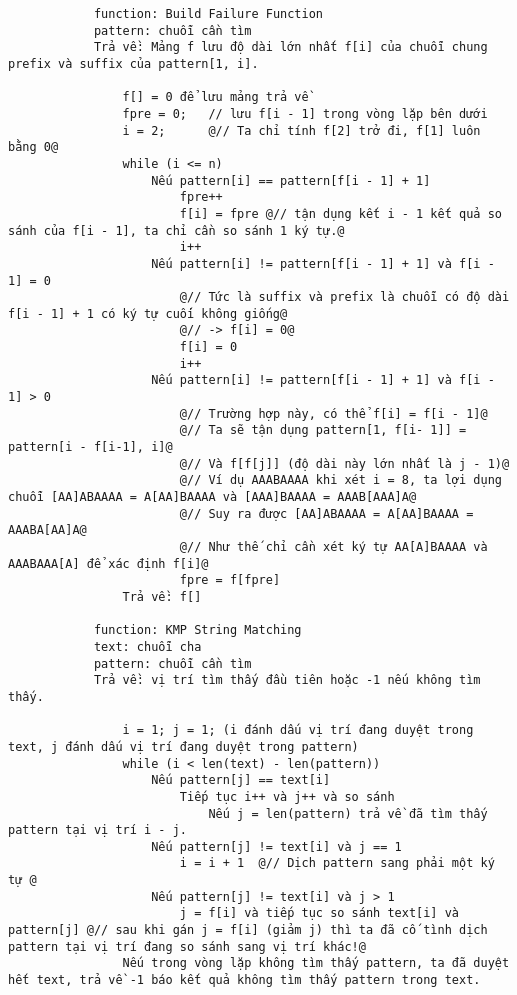 \documentclass[a4paper,11pt]{article}
\begin{document}
			\begin{lstlisting}
			function: Build Failure Function
			pattern: chuỗi cần tìm 
			Trả về: Mảng f lưu độ dài lớn nhất f[i] của chuỗi chung prefix và suffix của pattern[1, i].

				f[] = 0 để lưu mảng trả về
				fpre = 0;   // lưu f[i - 1] trong vòng lặp bên dưới
				i = 2;		@// Ta chỉ tính f[2] trở đi, f[1] luôn bằng 0@
				while (i <= n)		
					Nếu pattern[i] == pattern[f[i - 1] + 1]
						fpre++
						f[i] = fpre	@// tận dụng kết i - 1 kết quả so sánh của f[i - 1], ta chỉ cần so sánh 1 ký tự.@
						i++
					Nếu pattern[i] != pattern[f[i - 1] + 1] và f[i - 1] = 0
						@// Tức là suffix và prefix là chuỗi có độ dài f[i - 1] + 1 có ký tự cuối không giống@
						@// -> f[i] = 0@
						f[i] = 0
						i++
					Nếu pattern[i] != pattern[f[i - 1] + 1] và f[i - 1] > 0
						@// Trường hợp này, có thể f[i] = f[i - 1]@
						@// Ta sẽ tận dụng pattern[1, f[i- 1]] = pattern[i - f[i-1], i]@
						@// Và f[f[j]] (độ dài này lớn nhất là j - 1)@
						@// Ví dụ AAABAAAA khi xét i = 8, ta lợi dụng chuỗi [AA]ABAAAA = A[AA]BAAAA và [AAA]BAAAA = AAAB[AAA]A@
						@// Suy ra được [AA]ABAAAA = A[AA]BAAAA = AAABA[AA]A@
						@// Như thế chỉ cần xét ký tự AA[A]BAAAA và AAABAAA[A] để xác định f[i]@
						fpre = f[fpre]
				Trả về: f[]

			function: KMP String Matching
			text: chuỗi cha 
			pattern: chuỗi cần tìm 
			Trả về: vị trí tìm thấy đầu tiên hoặc -1 nếu không tìm thấy.

				i = 1; j = 1; (i đánh dấu vị trí đang duyệt trong text, j đánh dấu vị trí đang duyệt trong pattern)
				while (i < len(text) - len(pattern))
					Nếu pattern[j] == text[i]
						Tiếp tục i++ và j++ và so sánh
							Nếu j = len(pattern) trả về đã tìm thấy pattern tại vị trí i - j.
					Nếu pattern[j] != text[i] và j == 1
						i = i + 1  @// Dịch pattern sang phải một ký tự @
					Nếu pattern[j] != text[i] và j > 1
						j = f[i] và tiếp tục so sánh text[i] và pattern[j] @// sau khi gán j = f[i] (giảm j) thì ta đã cố tình dịch pattern tại vị trí đang so sánh sang vị trí khác!@
				Nếu trong vòng lặp không tìm thấy pattern, ta đã duyệt hết text, trả về -1 báo kết quả không tìm thấy pattern trong text.
					\end{lstlisting}
			
\end{document}

